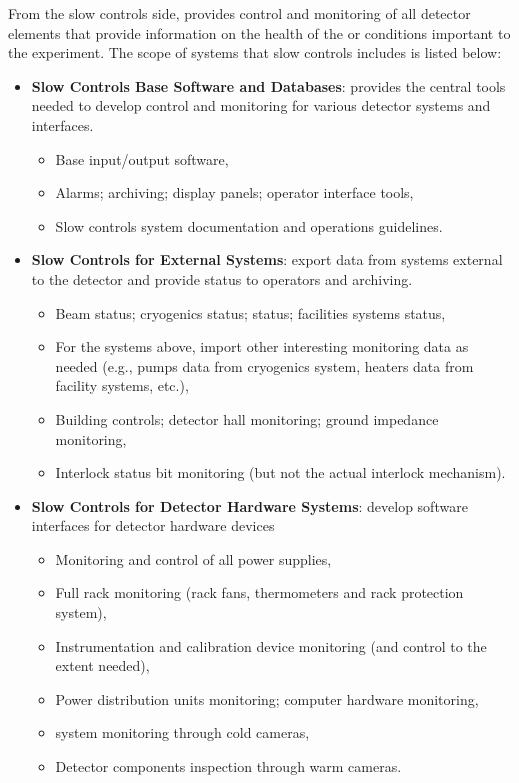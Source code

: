 From the slow controls side,   provides control and monitoring of
all detector elements that provide information on the health of the
 or conditions important to the experiment.
The scope of systems that slow controls includes is listed below:

\begin{itemize}
\item {\bf Slow Controls Base Software and Databases}: provides the central tools needed to develop control and monitoring for various detector systems and interfaces.
  \begin{itemize}
  \item Base input/output software,
  \item Alarms; archiving; display panels; operator interface tools,
  \item Slow controls system documentation and operations guidelines.
  \end{itemize}
\item {\bf Slow Controls for External Systems}: export data from systems external to the detector and provide status to operators and archiving.
  \begin{itemize}
  \item Beam status; cryogenics status;  status; facilities systems status,
  \item For the systems above, import other interesting monitoring data as needed (e.g., pumps data from cryogenics system, heaters data from facility systems, etc.),
  \item Building controls; detector hall monitoring; ground impedance monitoring,
  \item Interlock status bit monitoring (but not the actual interlock mechanism).
  \end{itemize}
\item {\bf Slow Controls for Detector Hardware Systems}: develop software interfaces for detector hardware devices
  \begin{itemize}
  \item Monitoring and control of all power supplies,
  \item Full rack monitoring (rack fans, thermometers and rack protection system),
  \item Instrumentation and calibration device monitoring (and control to the extent needed),
  \item Power distribution units monitoring; computer hardware monitoring,
  \item {} system monitoring through cold cameras,
  \item Detector components inspection through warm cameras.
  \end{itemize}
\end{itemize}

